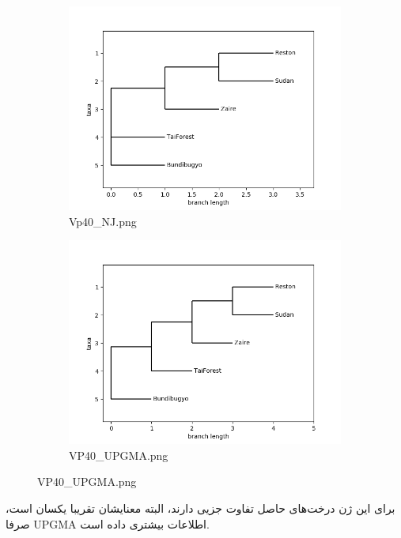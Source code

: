 \documentclass[11pt]{article}
\begin{document}
\begin{figure}[H]
  \centering
  \begin{subfigure}[b]{0.4\linewidth}
    \includegraphics[width=\linewidth]{../Data/Trees/VP40_NJ.png}
    \caption{Vp40\_NJ.png}
  \end{subfigure}
  \begin{subfigure}[b]{0.4\linewidth}
    \includegraphics[width=\linewidth]{../Data/Trees/VP40_UPGMA.png}
    \caption{VP40\_UPGMA.png}
  \end{subfigure}
\end{figure}
برای این ژن درخت‌های حاصل تفاوت جزیی دارند، البته معنایشان تقریبا یکسان است، صرفا UPGMA اطلاعات بیشتری داده است.
\newline
\end{document}
